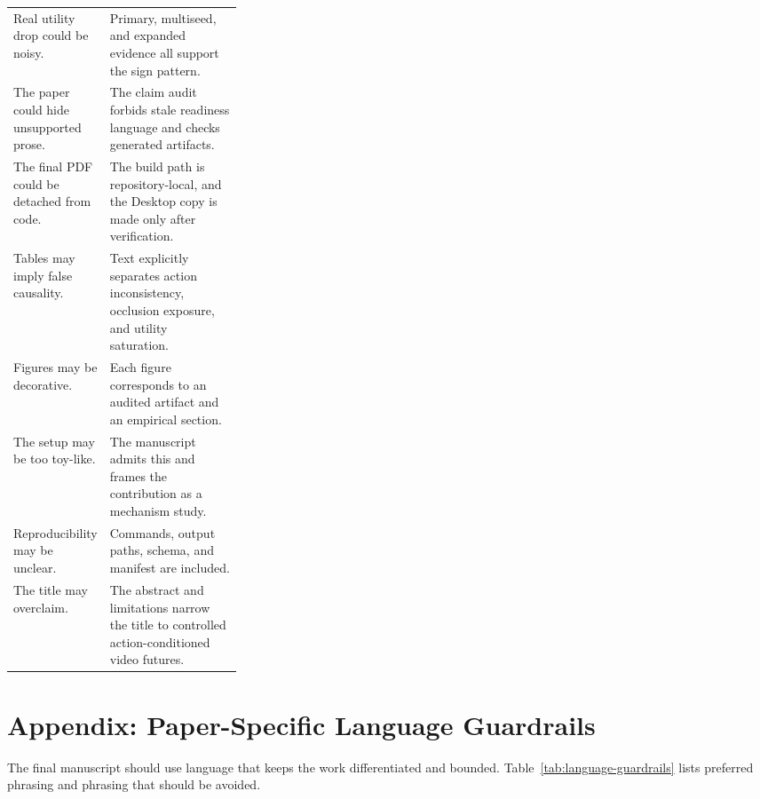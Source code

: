 \documentclass{article}
\begin{document}
\begin{table}[tbp]
\begin{tabularx}{\linewidth}{@{}p{0.30\linewidth}X@{}}
    Real utility drop could be noisy. & Primary, multiseed, and expanded evidence all support the sign pattern. \\
    The paper could hide unsupported prose. & The claim audit forbids stale readiness language and checks generated artifacts. \\
    The final PDF could be detached from code. & The build path is repository-local, and the Desktop copy is made only after verification. \\
    Tables may imply false causality. & Text explicitly separates action inconsistency, occlusion exposure, and utility saturation. \\
    Figures may be decorative. & Each figure corresponds to an audited artifact and an empirical section. \\
    The setup may be too toy-like. & The manuscript admits this and frames the contribution as a mechanism study. \\
    Reproducibility may be unclear. & Commands, output paths, schema, and manifest are included. \\
    The title may overclaim. & The abstract and limitations narrow the title to controlled action-conditioned video futures. \\
    \bottomrule
  \end{tabularx}
\end{table}

\section{Appendix: Paper-Specific Language Guardrails}
\label{app:language-guardrails}

The final manuscript should use language that keeps the work differentiated and bounded. Table~\ref{tab:language-guardrails} lists preferred phrasing and phrasing that should be avoided.
\end{document}
